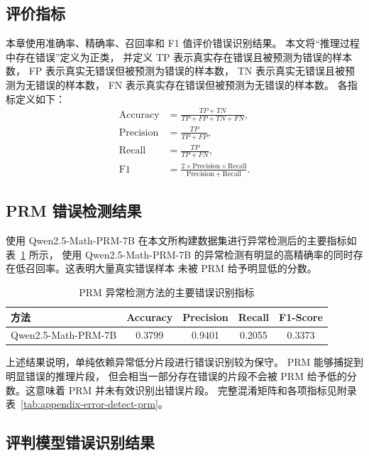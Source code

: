 \subsection{评价指标}

本章使用准确率、精确率、召回率和 F1 值评价错误识别结果。
本文将“推理过程中存在错误”定义为正类，
并定义 TP 表示真实存在错误且被预测为错误的样本数，
FP 表示真实无错误但被预测为错误的样本数，
TN 表示真实无错误且被预测为无错误的样本数，
FN 表示真实存在错误但被预测为无错误的样本数。
各指标定义如下：
\begin{align}
\mathrm{Accuracy} &= \frac{TP + TN}{TP + FP + TN + FN},\\
\mathrm{Precision} &= \frac{TP}{TP + FP},\\
\mathrm{Recall} &= \frac{TP}{TP + FN},\\
\mathrm{F1} &= \frac{2 \times \mathrm{Precision} \times \mathrm{Recall}}
{\mathrm{Precision} + \mathrm{Recall}}.
\end{align}


\subsection{PRM 错误检测结果}

使用 Qwen2.5-Math-PRM-7B 在本文所构建数据集进行异常检测后的主要指标如表~\ref{tab:error-detect-prm-main} 所示，
使用 Qwen2.5-Math-PRM-7B 的异常检测有明显的高精确率的同时存在低召回率。这表明大量真实错误样本
未被 PRM 给予明显低的分数。

\begin{table}[htbp]
\caption{PRM 异常检测方法的主要错误识别指标}
\label{tab:error-detect-prm-main}
\vspace{0.5em}\centering\wuhao
\begin{tabular}{lcccc}
\toprule
方法 & Accuracy & Precision & Recall & F1-Score \\
\midrule
Qwen2.5-Math-PRM-7B & 0.3799 & 0.9401 & 0.2055 & 0.3373 \\
\bottomrule
\end{tabular}
\end{table}

上述结果说明，单纯依赖异常低分片段进行错误识别较为保守。
PRM 能够捕捉到明显错误的推理片段，
但会相当一部分存在错误的片段不会被 PRM 给予低的分数。这意味着 PRM 并未有效识别出错误片段。
完整混淆矩阵和各项指标见附录表~\ref{tab:appendix-error-detect-prm}。

\subsection{评判模型错误识别结果}


